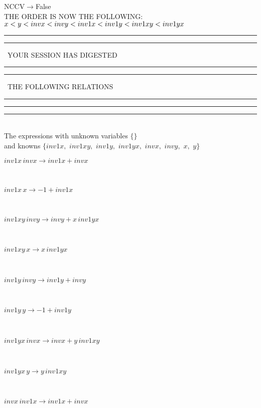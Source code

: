 \documentclass[rep10,leqno]{report}
\begin{document}
NCCV$\rightarrow $False\\
THE ORDER IS NOW THE FOLLOWING:\hfil\break
$
x<y<invx<invy<inv1x<inv1y<inv1xy<inv1yx\\
$
\rule[2pt]{6in}{4pt}\hfil\break
\rule[2pt]{1.879in}{4pt}
\ YOUR SESSION HAS DIGESTED\ 
\rule[2pt]{1.879in}{4pt}\hfil\break
\rule[2pt]{1.923in}{4pt}
\ THE FOLLOWING RELATIONS\ 
\rule[2pt]{1.923in}{4pt}\hfil\break
\rule[2pt]{6in}{4pt}\hfil\break
\rule[3pt]{6in}{.7pt}\\
The expressions with unknown variables $\{\}$\\
and knowns $\{inv1x,
$ $
inv1xy,
$ $
inv1y,
$ $
inv1yx,
$ $
invx,
$ $
invy,
$ $
x,
$ $
y\}$\smallskip\\
\begin{minipage}{6in}
$
inv1x\,
 invx\rightarrow inv1x + invx
$
\end{minipage}\medskip \\
\begin{minipage}{6in}
$
inv1x\,
 x\rightarrow -1 + inv1x
$
\end{minipage}\medskip \\
\begin{minipage}{6in}
$
inv1xy\,
 invy\rightarrow invy + x\,
 inv1yx
$
\end{minipage}\medskip \\
\begin{minipage}{6in}
$
inv1xy\,
 x\rightarrow x\,
 inv1yx
$
\end{minipage}\medskip \\
\begin{minipage}{6in}
$
inv1y\,
 invy\rightarrow inv1y + invy
$
\end{minipage}\medskip \\
\begin{minipage}{6in}
$
inv1y\,
 y\rightarrow -1 + inv1y
$
\end{minipage}\medskip \\
\begin{minipage}{6in}
$
inv1yx\,
 invx\rightarrow invx + y\,
 inv1xy
$
\end{minipage}\medskip \\
\begin{minipage}{6in}
$
inv1yx\,
 y\rightarrow y\,
 inv1xy
$
\end{minipage}\medskip \\
\begin{minipage}{6in}
$
invx\,
 inv1x\rightarrow inv1x + invx
$
\end{minipage}\medskip \\
\end{document}

